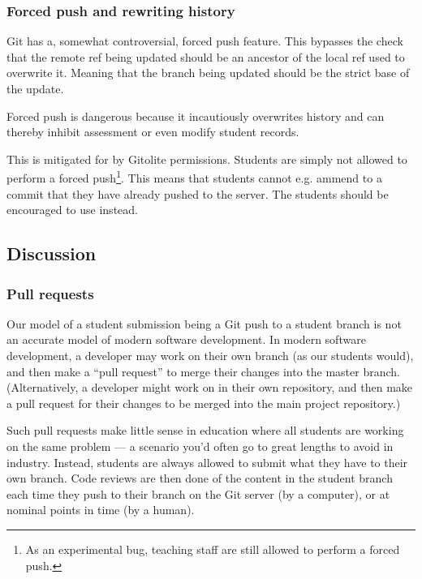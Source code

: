 \subsubsection{Forced push and rewriting history}

Git has a, somewhat controversial\cite{torvalds-2007,hamano-2009,rego-2013},
forced push feature. This bypasses the check that the remote ref being updated
should be an ancestor of the local ref used to overwrite
it\cite{man-1-git-push}. Meaning that the branch being updated should be the
strict base of the update.

Forced push is dangerous because it incautiously overwrites history and can
thereby inhibit assessment or even modify student records.

This is mitigated for by Gitolite permissions. Students are simply not allowed
to perform a forced push\footnote{As an experimental bug, teaching staff are
still allowed to perform a forced push.}. This means that students cannot e.g.
ammend to a commit that they have already pushed to the server. The students
should be encouraged to use \cite{man-1-git-revert} instead.

\subsection{Discussion}

\subsubsection{Pull requests}

Our model of a student submission being a Git push to a student branch is not
an accurate model of modern software development. In modern software
development, a developer may work on their own branch (as our students would),
and then make a ``pull request'' to merge their changes into the master branch.
(Alternatively, a developer might work on in their own repository, and then
make a pull request for their changes to be merged into the main project
repository\cite{bird-et-al-2009}.)

Such pull requests make little sense in education where all students are
working on the same problem --- a scenario you'd often go to great lengths to
avoid in industry. Instead, students are always allowed to submit what they
have to their own branch. Code reviews are then done of the content in the
student branch each time they push to their branch on the Git server (by a
computer), or at nominal points in time (by a human).

